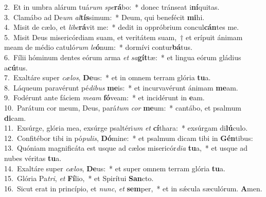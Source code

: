 {2.~}Et in umbra alárum tuá\textit{rum} \textit{spe}\textbf{rá}bo:~* donec tránseat i\textbf{ní}quitas.\\
{3.~}Clamábo ad De\textit{um} \textit{al}\textbf{tís}simum:~* Deum, qui benefécit \textbf{mi}hi.\\
{4.~}Misit de cælo, et \textit{li}\textit{be}\textbf{rá}vit me:~* dedit in oppróbrium concul\textbf{cán}tes me.\\
{5.~}Misit Deus misericórdiam suam, et veritátem suam,~† et erípuit ánimam meam de médio catuló\textit{rum} \textit{le}\textbf{ó}num:~* dormívi contur\textbf{bá}tus.\\
{6.~}Fílii hóminum dentes eórum arma \textit{et} \textit{sa}\textbf{gít}tæ:~* et lingua eórum gládius a\textbf{cú}tus.\\
{7.~}Exaltáre super \textit{cæ}\textit{los}, \textbf{De}us:~* et in omnem terram glória \textbf{tu}a.\\
{8.~}Láqueum paravérunt pé\textit{di}\textit{bus} \textbf{me}is:~* et incurvavérunt ánimam \textbf{me}am.\\
{9.~}Fodérunt ante fáciem \textit{me}\textit{am} \textbf{fó}veam:~* et incidérunt in \textbf{e}am.\\
{10.~}Parátum cor meum, Deus, pará\textit{tum} \textit{cor} \textbf{me}um:~* cantábo, et psalmum \textbf{di}cam.\\
{11.~}Exsúrge, glória mea, exsúrge psaltéri\textit{um} \textit{et} \textbf{cí}thara:~* exsúrgam di\textbf{lú}culo.\\
{12.~}Confitébor tibi in pó\textit{pu}\textit{lis}, \textbf{Dó}mine:~* et psalmum dicam tibi in \textbf{Gén}tibus:\\
{13.~}Quóniam magnificáta est usque ad cælos misericór\textit{di}\textit{a} \textbf{tu}a,~* et usque ad nubes véritas \textbf{tu}a.\\
{14.~}Exaltáre super \textit{cæ}\textit{los}, \textbf{De}us:~* et super omnem terram glória \textbf{tu}a.\\
{15.~}Glória Pa\textit{tri}, \textit{et} \textbf{Fí}lio,~* et Spirítui \textbf{San}cto.\\
{16.~}Sicut erat in princípio, et \textit{nunc}, \textit{et} \textbf{sem}per,~* et in sǽcula sæculórum. \textbf{A}men.\\
